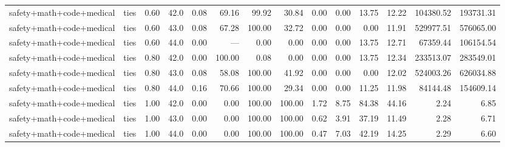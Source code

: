 \documentclass{article}
\begin{document}
\begin{table}[H]
{\begin{tabular}{llllrrrrrrrrrr}
safety+math+code+medical & ties & 0.60 & 42.0 & 0.08 & 69.16 & 99.92 & 30.84 & 0.00 & 0.00 & 13.75 & 12.22 & 104380.52 & 193731.31 \\
safety+math+code+medical & ties & 0.60 & 43.0 & 0.08 & 67.28 & 100.00 & 32.72 & 0.00 & 0.00 & 0.00 & 11.91 & 529977.51 & 576065.00 \\
safety+math+code+medical & ties & 0.60 & 44.0 & 0.00 & --- & 0.00 & 0.00 & 0.00 & 0.00 & 13.75 & 12.71 & 67359.44 & 106154.54 \\
safety+math+code+medical & ties & 0.80 & 42.0 & 0.00 & 100.00 & 0.08 & 0.00 & 0.00 & 0.00 & 13.75 & 12.34 & 233513.07 & 283549.01 \\
safety+math+code+medical & ties & 0.80 & 43.0 & 0.08 & 58.08 & 100.00 & 41.92 & 0.00 & 0.00 & 0.00 & 12.02 & 524003.26 & 626034.88 \\
safety+math+code+medical & ties & 0.80 & 44.0 & 0.16 & 70.66 & 100.00 & 29.34 & 0.00 & 0.00 & 11.25 & 11.98 & 84144.48 & 154609.14 \\
safety+math+code+medical & ties & 1.00 & 42.0 & 0.00 & 0.00 & 100.00 & 100.00 & 1.72 & 8.75 & 84.38 & 44.16 & 2.24 & 6.85 \\
safety+math+code+medical & ties & 1.00 & 43.0 & 0.00 & 0.00 & 100.00 & 100.00 & 0.62 & 3.91 & 37.19 & 11.49 & 2.28 & 6.71 \\
safety+math+code+medical & ties & 1.00 & 44.0 & 0.00 & 0.00 & 100.00 & 100.00 & 0.47 & 7.03 & 42.19 & 14.25 & 2.29 & 6.60 \\
\bottomrule
\end{tabular}
}
\end{table}
\end{document}
